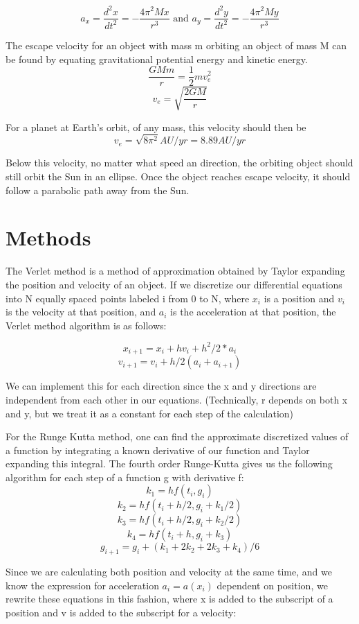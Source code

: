 \documentclass[11pt]{article}
\begin{document}
\begin{equation}
\label{eq:diffeqs1}
a_x=\frac{d^{2}x}{dt^{2}} = -\frac{4\pi^2Mx}{r^{3}}\text{ and } a_y = \frac{d^{2}y}{dt^{2}} = -\frac{4\pi^2My}{r^{3}}
\end{equation}

The escape velocity for an object with mass m orbiting an object of mass M can be found by equating gravitational potential energy and kinetic energy.
$$\frac{GMm}{r} = \frac{1}{2}mv_e^2$$
$$v_e=\sqrt{\frac{2GM}{r}}$$

For a planet at Earth's orbit, of any mass, this velocity should then be
$$v_e = \sqrt{8\pi^2} AU/yr = 8.89 AU/yr$$

Below this velocity, no matter what speed an direction, the orbiting object should still orbit the Sun in an ellipse. Once the object reaches escape velocity, it should follow a parabolic path away from the Sun.

\section{Methods}

The Verlet method is a method of approximation obtained by Taylor expanding the position and velocity of an object. If we discretize our differential equations into N equally spaced points labeled i from 0 to N, where $x_i$ is a position and $v_i$ is the velocity at that position, and $a_i$ is the acceleration at that position, the Verlet method algorithm is as follows:

$$x_{i+1}=x_i+hv_i + h^2/2 * a_i$$
$$v_{i+1}=v_i+h/2(a_i+a_{i+1})$$

We can implement this for each direction since the x and y directions are independent from each other in our equations. (Technically, r depends on both x and y, but we treat it as a constant for each step of the calculation)


For the Runge Kutta method, one can find the approximate discretized values of a function by integrating a known derivative of our function and Taylor expanding this integral. The fourth order Runge-Kutta gives us the following algorithm for each step of a function g with derivative f:
$$k_1 = hf(t_i,g_i)$$
$$k_2 = hf(t_i+h/2,g_i + k_1/2)$$
$$k_3 = hf(t_i + h/2,g_i + k_2/2)$$
$$k_4 = hf(t_i + h, g_i+k_3)$$
$$g_{i+1} = g_i + (k_1 + 2k_2 + 2k_3 + k_4)/6$$

Since we are calculating both position and velocity at the same time, and we know the expression for acceleration $a_i=a(x_i)$ dependent on position, we rewrite these equations in this fashion, where x is added to the subscript of a position and v is added to the subscript for a velocity:
\end{document}
